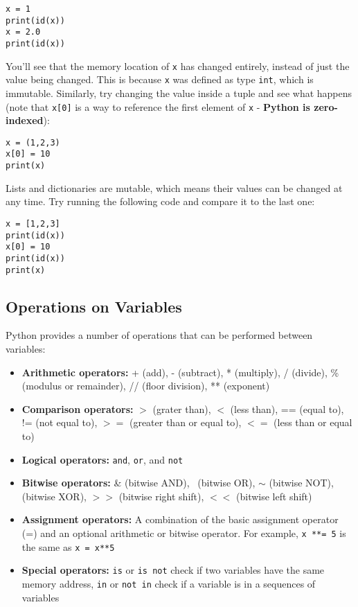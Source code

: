 \documentclass[12pt]{article}
\newcommand{\code}{\texttt}
\begin{document}
\begin{lstlisting}[frame=single] 
x = 1
print(id(x))
x = 2.0
print(id(x))
\end{lstlisting}

You'll see that the memory location of \code{x} has changed entirely, instead of just the value being changed. This is because \code{x} was defined as type \code{int}, which is immutable. Similarly, try changing the value inside a tuple and see what happens (note that \code{x[0]} is a way to reference the first element of \code{x} - \textbf{Python is zero-indexed}):

\begin{lstlisting}[frame=single] 
x = (1,2,3)
x[0] = 10
print(x)
\end{lstlisting}

Lists and dictionaries are mutable, which means their values can be changed at any time. Try running the following code and compare it to the last one: 

\begin{lstlisting}[frame=single] 
x = [1,2,3]
print(id(x))
x[0] = 10
print(id(x))
print(x)
\end{lstlisting}

\subsection{Operations on Variables}
Python provides a number of operations that can be performed between variables:

\begin{itemize}
	\item \textbf{Arithmetic operators:} + (add), - (subtract), * (multiply), / (divide), \% (modulus or remainder), // (floor division), ** (exponent)
	\item \textbf{Comparison operators:} $>$ (grater than), $<$ (less than), == (equal to), != (not equal to), $>=$ (greater than or equal to), $<=$ (less than or equal to)
	\item \textbf{Logical operators:} \code{and}, \code{or}, and \code{not}
	\item \textbf{Bitwise operators:} \& (bitwise AND), \textbar\ (bitwise OR), $\sim$ (bitwise NOT),  (bitwise XOR), $>>$ (bitwise right shift), $<<$ (bitwise left shift)
	\item \textbf{Assignment operators:} A combination of the basic assignment operator (=) and an optional arithmetic or bitwise operator. For example, \code{x **= 5} is the same as \code{x = x**5}
	\item \textbf{Special operators:} \code{is} or \code{is not} check if two variables have the same memory address, \code{in} or \code{not in} check if a variable is in a sequences of variables
\end{itemize}
\end{document}
